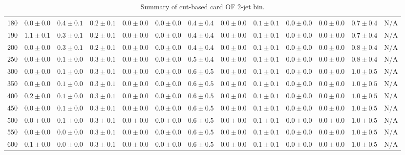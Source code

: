 \begin{table}
{\begin{center}
\begin{tabular}{l | c c | c c c c c c c c  | c c}
180 & $0.0\pm0.0$ & $0.4\pm0.1$ & $0.2\pm0.1$ & $0.0\pm0.0$ & $0.0\pm0.0$ & $0.4\pm0.4$ & $0.0\pm0.0$ & $0.1\pm0.1$ & $0.0\pm0.0$ & $0.0\pm0.0$ & $0.7\pm0.4$ & N/A \\
190 & $1.1\pm0.1$ & $0.3\pm0.1$ & $0.2\pm0.1$ & $0.0\pm0.0$ & $0.0\pm0.0$ & $0.4\pm0.4$ & $0.0\pm0.0$ & $0.1\pm0.1$ & $0.0\pm0.0$ & $0.0\pm0.0$ & $0.7\pm0.4$ & N/A \\
200 & $0.0\pm0.0$ & $0.3\pm0.1$ & $0.2\pm0.1$ & $0.0\pm0.0$ & $0.0\pm0.0$ & $0.4\pm0.4$ & $0.0\pm0.0$ & $0.1\pm0.1$ & $0.0\pm0.0$ & $0.0\pm0.0$ & $0.8\pm0.4$ & N/A \\
250 & $0.0\pm0.0$ & $0.1\pm0.0$ & $0.3\pm0.1$ & $0.0\pm0.0$ & $0.0\pm0.0$ & $0.5\pm0.4$ & $0.0\pm0.0$ & $0.1\pm0.1$ & $0.0\pm0.0$ & $0.0\pm0.0$ & $0.8\pm0.4$ & N/A \\
300 & $0.0\pm0.0$ & $0.1\pm0.0$ & $0.3\pm0.1$ & $0.0\pm0.0$ & $0.0\pm0.0$ & $0.6\pm0.5$ & $0.0\pm0.0$ & $0.1\pm0.1$ & $0.0\pm0.0$ & $0.0\pm0.0$ & $1.0\pm0.5$ & N/A \\
350 & $0.0\pm0.0$ & $0.1\pm0.0$ & $0.3\pm0.1$ & $0.0\pm0.0$ & $0.0\pm0.0$ & $0.6\pm0.5$ & $0.0\pm0.0$ & $0.1\pm0.1$ & $0.0\pm0.0$ & $0.0\pm0.0$ & $1.0\pm0.5$ & N/A \\
400 & $0.2\pm0.0$ & $0.1\pm0.0$ & $0.3\pm0.1$ & $0.0\pm0.0$ & $0.0\pm0.0$ & $0.6\pm0.5$ & $0.0\pm0.0$ & $0.1\pm0.1$ & $0.0\pm0.0$ & $0.0\pm0.0$ & $1.0\pm0.5$ & N/A \\
450 & $0.0\pm0.0$ & $0.1\pm0.0$ & $0.3\pm0.1$ & $0.0\pm0.0$ & $0.0\pm0.0$ & $0.6\pm0.5$ & $0.0\pm0.0$ & $0.1\pm0.1$ & $0.0\pm0.0$ & $0.0\pm0.0$ & $1.0\pm0.5$ & N/A \\
500 & $0.0\pm0.0$ & $0.1\pm0.0$ & $0.3\pm0.1$ & $0.0\pm0.0$ & $0.0\pm0.0$ & $0.6\pm0.5$ & $0.0\pm0.0$ & $0.1\pm0.1$ & $0.0\pm0.0$ & $0.0\pm0.0$ & $1.0\pm0.5$ & N/A \\
550 & $0.0\pm0.0$ & $0.0\pm0.0$ & $0.3\pm0.1$ & $0.0\pm0.0$ & $0.0\pm0.0$ & $0.6\pm0.5$ & $0.0\pm0.0$ & $0.1\pm0.1$ & $0.0\pm0.0$ & $0.0\pm0.0$ & $1.0\pm0.5$ & N/A \\
600 & $0.1\pm0.0$ & $0.0\pm0.0$ & $0.3\pm0.1$ & $0.0\pm0.0$ & $0.0\pm0.0$ & $0.6\pm0.5$ & $0.0\pm0.0$ & $0.1\pm0.1$ & $0.0\pm0.0$ & $0.0\pm0.0$ & $1.0\pm0.5$ & N/A \\
\hline
\end{tabular}
\end{center}
}
\caption{Summary of cut-based card OF 2-jet bin.}
\end{table}
